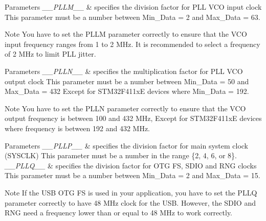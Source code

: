 \begin{DoxyParams}{Parameters}
{\em \+\_\+\+\_\+\+P\+L\+L\+M\+\_\+\+\_\+} & specifies the division factor for P\+LL V\+CO input clock This parameter must be a number between Min\+\_\+\+Data = 2 and Max\+\_\+\+Data = 63. \\
\hline
\end{DoxyParams}
\begin{DoxyNote}{Note}
You have to set the P\+L\+LM parameter correctly to ensure that the V\+CO input frequency ranges from 1 to 2 M\+Hz. It is recommended to select a frequency of 2 M\+Hz to limit P\+LL jitter. 
\end{DoxyNote}

\begin{DoxyParams}{Parameters}
{\em \+\_\+\+\_\+\+P\+L\+L\+N\+\_\+\+\_\+} & specifies the multiplication factor for P\+LL V\+CO output clock This parameter must be a number between Min\+\_\+\+Data = 50 and Max\+\_\+\+Data = 432 Except for S\+T\+M32\+F411xE devices where Min\+\_\+\+Data = 192. \\
\hline
\end{DoxyParams}
\begin{DoxyNote}{Note}
You have to set the P\+L\+LN parameter correctly to ensure that the V\+CO output frequency is between 100 and 432 M\+Hz, Except for S\+T\+M32\+F411xE devices where frequency is between 192 and 432 M\+Hz. 
\end{DoxyNote}

\begin{DoxyParams}{Parameters}
{\em \+\_\+\+\_\+\+P\+L\+L\+P\+\_\+\+\_\+} & specifies the division factor for main system clock (S\+Y\+S\+C\+LK) This parameter must be a number in the range \{2, 4, 6, or 8\}.\\
\hline
{\em \+\_\+\+\_\+\+P\+L\+L\+Q\+\_\+\+\_\+} & specifies the division factor for O\+TG FS, S\+D\+IO and R\+NG clocks This parameter must be a number between Min\+\_\+\+Data = 2 and Max\+\_\+\+Data = 15. \\
\hline
\end{DoxyParams}
\begin{DoxyNote}{Note}
If the U\+SB O\+TG FS is used in your application, you have to set the P\+L\+LQ parameter correctly to have 48 M\+Hz clock for the U\+SB. However, the S\+D\+IO and R\+NG need a frequency lower than or equal to 48 M\+Hz to work correctly. 
\end{DoxyNote}
\mbox{\label{group___r_c_c_ex___exported___macros_ga5a2fa2687b621f6eda72457d09715298}} 
